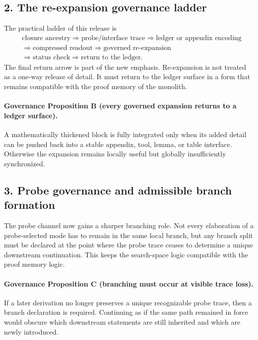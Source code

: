 \subsection*{2. The re-expansion governance ladder}
The practical ladder of this release is
\[
\begin{aligned}
&\text{closure ancestry} \Longrightarrow \text{probe/interface trace} \Longrightarrow \text{ledger or appendix encoding}\\
&\Longrightarrow \text{compressed readout} \Longrightarrow \text{governed re-expansion}\\
&\Longrightarrow \text{status check} \Longrightarrow \text{return to the ledger}.
\end{aligned}
\]
The final return arrow is part of the new emphasis. Re-expansion is not treated
as a one-way release of detail. It must return to the ledger surface in a form
that remains compatible with the proof memory of the monolith.

\paragraph{Governance Proposition B (every governed expansion returns to a ledger surface).}
A mathematically thickened block is fully integrated only when its added detail
can be pushed back into a stable appendix, tool, lemma, or table interface.
Otherwise the expansion remains locally useful but globally insufficiently
synchronized.

\subsection*{3. Probe governance and admissible branch formation}
The probe channel now gains a sharper branching role. Not every elaboration of a
probe-selected mode has to remain in the same local branch, but any branch split
must be declared at the point where the probe trace ceases to determine a unique
downstream continuation. This keeps the search-space logic compatible with the
proof memory logic.

\paragraph{Governance Proposition C (branching must occur at visible trace loss).}
If a later derivation no longer preserves a unique recognizable probe trace,
then a branch declaration is required. Continuing as if the same path remained
in force would obscure which downstream statements are still inherited and which
are newly introduced.

